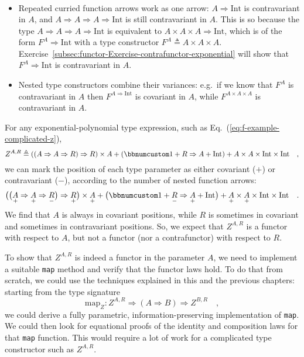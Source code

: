 \begin{itemize}
\begin{align*}
\end{align*}
\item Repeated curried function arrows work as one arrow: $A\Rightarrow\text{Int}$
is contravariant in $A$, and $A\Rightarrow A\Rightarrow A\Rightarrow\text{Int}$
is still contravariant in $A$. This is so because the type $A\Rightarrow A\Rightarrow A\Rightarrow\text{Int}$
is equivalent to $A\times A\times A\Rightarrow\text{Int}$, which
is of the form $F^{A}\Rightarrow\text{Int}$ with a type constructor
$F^{A}\triangleq A\times A\times A$. Exercise~\ref{subsec:functor-Exercise-contrafunctor-exponential}
will show that $F^{A}\Rightarrow\text{Int}$ is contravariant in $A$.
\item Nested type constructors combine their variances: e.g.~if we know
that $F^{A}$ is contravariant in $A$ then $F^{A\Rightarrow\text{Int}}$
is covariant in $A$, while $F^{A\times A\times A}$ is contravariant
in $A$.
\end{itemize}
For any exponential-polynomial type expression, such as Eq.~(\ref{eq:f-example-complicated-z}),
\[
Z^{A,R}\triangleq\left(\left(A\Rightarrow A\Rightarrow R\right)\Rightarrow R\right)\times A+\left(\bbnum 1+R\Rightarrow A+\text{Int}\right)+A\times A\times\text{Int}\times\text{Int}\quad,
\]
we can mark the position of each type parameter as either covariant
($+$) or contravariant ($-$), according to the number of nested
function arrows:
\[
\big(\big(\underset{+}{A}\Rightarrow\underset{+}{A}\Rightarrow\underset{-}{R}\big)\Rightarrow\underset{+}{R}\big)\times\underset{+}{A}+\big(\bbnum 1+\underset{-}{R}\Rightarrow\underset{+}{A}+\text{Int}\big)+\underset{+}{A}\times\underset{+}{A}\times\text{Int}\times\text{Int}\quad.
\]
We find that $A$ is always in covariant positions, while $R$ is
sometimes in covariant and sometimes in contravariant positions. So,
we expect that $Z^{A,R}$ is a functor with respect to $A$, but not
a functor (nor a contrafunctor) with respect to $R$.

To show that $Z^{A,R}$ is indeed a functor in the parameter $A$,
we need to implement a suitable \lstinline!map! method and verify
that the functor laws hold. To do that from scratch, we could use
the techniques explained in this and the previous chapters: starting
from the type signature 
\[
\text{map}_{Z}:Z^{A,R}\Rightarrow\left(A\Rightarrow B\right)\Rightarrow Z^{B,R}\quad,
\]
we could derive a fully parametric, information-preserving implementation
of \lstinline!map!. We could then look for equational proofs of the
identity and composition laws for that \lstinline!map! function.
This would require a lot of work for a complicated type constructor
such as $Z^{A,R}$.


